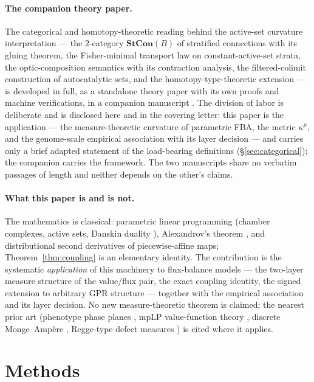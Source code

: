 \documentclass[11pt,a4paper]{article}
\theoremstyle{plain}
\theoremstyle{definition}
\theoremstyle{remark}
\newcommand{\kmu}{\kappa^{\mu}}
\begin{document}
\paragraph{The companion theory paper.}
The categorical and homotopy-theoretic reading behind the
active-set curvature interpretation --- the $2$-category
$\mathbf{StCon}(B)$ of stratified connections with its gluing
theorem, the Fisher-minimal transport law on constant-active-set
strata, the optic-composition semantics with its contraction
analysis, the filtered-colimit construction of autocatalytic sets,
and the homotopy-type-theoretic extension --- is developed in full,
as a standalone theory paper with its own proofs and machine
verifications, in a companion manuscript \citep{zai2026categorical}.
The division of labor is deliberate and is disclosed here and in the
covering letter: this paper is the application --- the
measure-theoretic curvature of parametric FBA, the metric $\kmu$,
and the genome-scale empirical association with its layer decision
--- and carries only a brief adapted statement of the load-bearing
definitions (\S\ref{sec:categorical}); the companion carries the
framework. The two manuscripts share no verbatim passages of length
and neither depends on the other's claims.

\paragraph{What this paper is and is not.}
The mathematics is classical: parametric linear programming (chamber
complexes, active sets, Danskin duality \citep{danskin1967}), Alexandrov's theorem \citep{alexandrov1939}, and
distributional second derivatives of piecewise-affine maps;
Theorem~\ref{thm:coupling} is an elementary identity. The contribution
is the systematic \emph{application} of this machinery to flux-balance
models \citep{varma1994, orth2010, lewis2010} --- the two-layer measure structure of the value/flux pair,
the exact coupling identity, the signed extension to arbitrary GPR
structure --- together with the empirical association and its layer
decision. No new measure-theoretic theorem is claimed; the nearest
prior art (phenotype phase planes \citep{edwards2001, ibarra2002}, mpLP
value-function theory \citep{borrelli2003},
discrete Monge--Amp\`ere \citep{gutierrez2001}, Regge-type defect measures \citep{regge1961, cheeger1984}) is cited where
it applies.

\section{Methods}\label{sec:methods}
\end{document}
